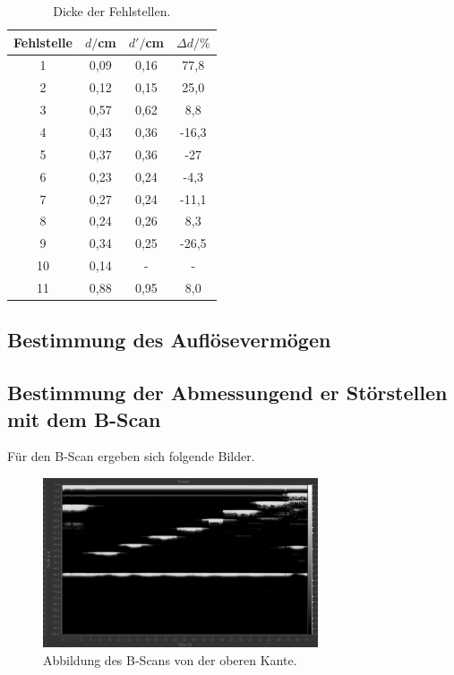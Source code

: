 \begin{table}[H]
  \centering
  \caption{Dicke der Fehlstellen.}
  \label{tab:spannung1}
  \begin{tabular}{c c c c}
    \toprule
  Fehlstelle & $d/$cm & $d'/$cm & $\Delta d/ \%$  \\
    \midrule
    1  &  0,09 & 0,16 & 77,8    \\
    2  &  0,12 & 0,15 & 25,0  \\
    3  &  0,57 & 0,62 & 8,8   \\
    4  &  0,43 & 0,36 & -16,3  \\
    5  &  0,37 & 0,36 & -27   \\
    6  &  0,23 & 0,24 & -4,3   \\
    7  &  0,27 & 0,24 & -11,1   \\
    8  &  0,24 & 0,26 & 8,3   \\
    9  &  0,34 & 0,25 & -26,5   \\
    10 &  0,14 & -    & -    \\
    11 &  0,88 & 0,95 & 8,0   \\
    \bottomrule
  \end{tabular}
\end{table}


\subsection{Bestimmung des Auflösevermögen}



\subsection{Bestimmung der Abmessungend er Störstellen mit dem B-Scan}

Für den B-Scan ergeben sich folgende Bilder.

\begin{figure}[H]
  \centering
  \includegraphics[height=5cm]{BScanoben.PNG}
  \caption{Abbildung des B-Scans von der oberen Kante.}
  \label{fig:acryl}
\end{figure}

